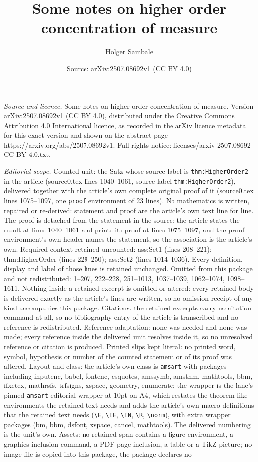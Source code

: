 \documentclass[10pt,a4paper]{amsart}
\title[Some notes on higher order concentration of measure]{Some notes on higher order concentration of measure}
\author{Holger Sambale}
\date{Source: arXiv:2507.08692v1 (CC BY 4.0)}
\begin{document}
\maketitle

\noindent\emph{Source and licence.} Some notes on higher order concentration of measure. Version arXiv:2507.08692v1 (CC BY 4.0), distributed under the Creative Commons Attribution 4.0 International licence, as recorded in the arXiv licence metadata for this exact version and shown on the abstract page https://arxiv.org/abs/2507.08692v1. Full rights notice: licenses/arxiv-2507.08692-CC-BY-4.0.txt.\par\smallskip

\noindent\textit{Editorial scope.} Counted unit: the Satz whose source label is \texttt{thm:HigherOrder2} in the article (source0.tex lines 1040--1061, source label \texttt{thm:HigherOrder2}), delivered together with the article's own complete original proof of it (source0.tex lines 1075--1097, one \texttt{proof} environment of 23 lines). No mathematics is written, repaired or re-derived: statement and proof are the article's own text line for line. The proof is detached from the statement in the source: the article states the result at lines 1040--1061 and prints its proof at lines 1075--1097, and the proof environment's own header names the statement, so the association is the article's own. Required context retained uncounted: ass:Set1 (lines 208--221); thm:HigherOrder (lines 229--250); ass:Set2 (lines 1014--1036). Every definition, display and label of those lines is retained unchanged. Omitted from this package and not redistributed: 1--207, 222--228, 251--1013, 1037--1039, 1062--1074, 1098--1611. Nothing inside a retained excerpt is omitted or altered: every retained body is delivered exactly as the article's lines are written, so no omission receipt of any kind accompanies this package. Citations: the retained excerpts carry no citation command at all, so no bibliography entry of the article is transcribed and no reference is redistributed. Reference adaptation: none was needed and none was made; every reference inside the delivered unit resolves inside it, so no unresolved reference or citation is produced. Printed slips kept literal: no printed word, symbol, hypothesis or number of the counted statement or of its proof was altered. Layout and class: the article's own class is \texttt{amsart} with packages including inputenc, babel, fontenc, csquotes, amssymb, amsthm, mathtools, bbm, ifxetex, mathrsfs, trfsigns, xspace, geometry, enumerate; the wrapper is the lane's pinned \texttt{amsart} editorial wrapper at 10pt on A4, which restates the theorem-like environments the retained text needs and adds the article's own macro definitions that the retained text needs (\texttt{\textbackslash E}, \texttt{\textbackslash IE}, \texttt{\textbackslash IN}, \texttt{\textbackslash R}, \texttt{\textbackslash norm}), with extra wrapper packages (bm, bbm, dsfont, xspace, cancel, mathtools). The delivered numbering is the unit's own. Assets: no retained span contains a figure environment, a graphics-inclusion command, a PDF-page inclusion, a table or a TikZ picture; no image file is copied into this package, the package declares no 
\end{document}
